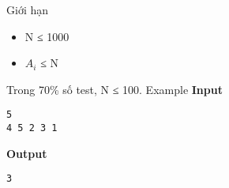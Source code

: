 Giới hạn
\begin{itemize}
	\item N ≤ 1000
	\item $A_{i}$ ≤ N
\end{itemize}

Trong 70\% số test, N ≤ 100.
Example
\textbf{Input }
\begin{verbatim}
5
4 5 2 3 1\end{verbatim}

\textbf{Output }
\begin{verbatim}
3\end{verbatim}